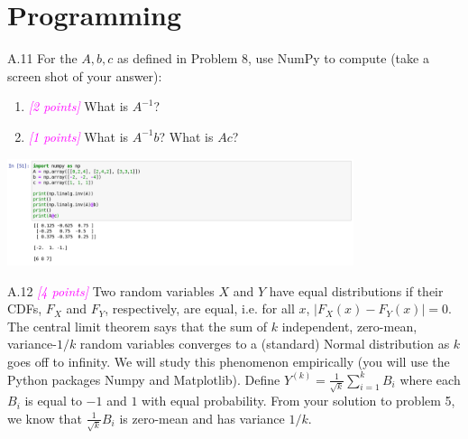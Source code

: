 \documentclass{article}
\newcommand{\1}{\mathbf{1}}
\newcommand{\points}[1]{\small\textcolor{magenta}{\emph{[#1 points]}} \normalsize}
\begin{document}
\newpage
\section*{Programming}
A.11 For the $A, b, c$ as defined in Problem 8, use
  NumPy to compute (take a screen shot of your answer):
  \begin{enumerate}
  \item \points{2} What is $A^{-1}$?
  \item \points{1} What is $A^{-1}b$? What is $Ac$?
  \end{enumerate}  
  
    \begin{center}
    \includegraphics[width=4in]{HW0_plots/numpy.png}
    \end{center} 

\newpage
A.12 \points{4} Two random variables $X$ and $Y$ have equal distributions if their CDFs, $F_X$ and $F_Y$, respectively, are equal, i.e. for all $x$, $ |F_X(x) - F_Y(x)| = 0$. The central limit theorem says that the sum of $k$ independent, zero-mean, variance-$1/k$ random variables converges to a (standard) Normal distribution as $k$ goes off to infinity. We will study this phenomenon empirically (you will use the Python packages Numpy and Matplotlib). Define $Y^{(k)} = \frac{1}{\sqrt{k}} \sum_{i=1}^k B_i$ where each $B_i$ is equal to $-1$ and $1$ with equal probability. From your solution to problem 5, we know that $\frac{1}{\sqrt{k}} B_i$ is zero-mean and has variance $1/k$.
\end{document}
